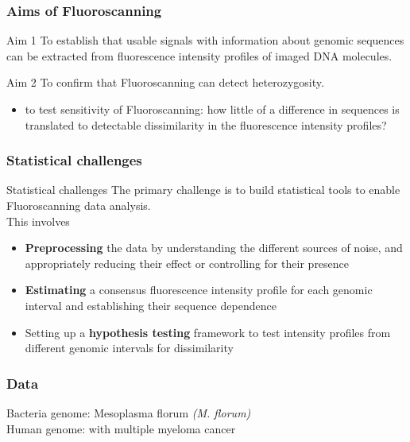 \documentclass[10pt,dvipsnames,table]{beamer}
\begin{document}
\begin{frame}
\frametitle{Aims of Fluoroscanning}
\begin{block}{Aim 1}
To establish that usable signals with information about genomic sequences can be extracted from fluorescence intensity profiles of imaged DNA molecules.
\end{block}
\vspace{1cm}
\begin{block}{Aim 2}
To confirm that Fluoroscanning can detect heterozygosity. 
\begin{itemize}
\footnotesize
\item to test sensitivity of Fluoroscanning: how little of a difference in sequences is translated to detectable dissimilarity in the fluorescence intensity profiles?
\end{itemize}
\end{block}
\end{frame}

\begin{frame}
\frametitle{Statistical challenges}
\begin{block}{Statistical challenges}
{\Large{The primary challenge is to build statistical tools to enable Fluoroscanning data analysis.}} \\This involves
\begin{itemize}
\item {\bf{Preprocessing}} the data by understanding the different sources of noise, and appropriately reducing their effect or controlling for their presence
\vspace{0.5cm}
\item {\bf{Estimating}} a consensus fluorescence intensity profile for each genomic interval and establishing their sequence dependence
\vspace{0.5cm}
\item Setting up a {\bf{hypothesis testing}} framework to test intensity profiles from different genomic intervals for dissimilarity
\end{itemize}
\end{block}
\end{frame}

\begin{frame}
\frametitle{Data}
\Large
Bacteria genome: Mesoplasma florum {\emph{(M. florum)}} \\
\vspace{2cm}
Human genome: with multiple myeloma cancer
\end{frame}
\end{document}
